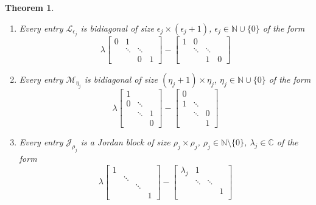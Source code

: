 \documentclass[]{book}
\providecommand{\tightlist}{%
  \setlength{\itemsep}{0pt}\setlength{\parskip}{0pt}}
\newtheorem{theorem}{Theorem}[chapter]
\theoremstyle{definition}
\theoremstyle{definition}
\theoremstyle{definition}
\theoremstyle{remark}
\begin{document}
\begin{theorem}
\begin{enumerate}
\def\labelenumi{\arabic{enumi}.}
\tightlist
\item
  Every entry \(\mathcal L_{\epsilon_j}\) is bidiagonal of size \(\epsilon_j\times (\epsilon_j +1)\), \(\epsilon_j \in \mathbb N \cup \{0\}\) of the form
  \begin{equation*}
  \lambda 
  \begin{bmatrix}
  0 & 1  \\
  & \ddots & \ddots \\
  && 0 & 1
  \end{bmatrix}
  -
  \begin{bmatrix}
  1 & 0  \\
  & \ddots & \ddots \\
  && 1 & 0
  \end{bmatrix}
  \end{equation*}
\item
  Every entry \(\mathcal M_{\eta_j}\) is bidiagonal of size \((\eta_j+1)\times \eta_j\), \(\eta_j \in \mathbb N \cup \{0\}\) of the form
  \begin{equation*}
  \lambda 
  \begin{bmatrix}
  1  \\
  0 & \ddots \\
  & \ddots & 1 \\
  && 0 
  \end{bmatrix}
  -
  \begin{bmatrix}
  0  \\
  1 & \ddots \\
  & \ddots & 0 \\
  && 1 
  \end{bmatrix}
  \end{equation*}
\item
  Every entry \(\mathcal J_{\rho_j}\) is a Jordan block of size \(\rho_j\times \rho_j\), \(\rho_j \in \mathbb N \setminus \{0\}\), \(\lambda_j \in \mathbb C\) of the form
  \begin{equation*}
  \lambda 
  \begin{bmatrix}
  1  \\
  & \ddots \\
  &&\ddots  \\
  &&& 1 
  \end{bmatrix}
  -
  \begin{bmatrix}
  \lambda_j & 1 \\
  & \ddots & \ddots \\
  &&& 1 \\

\end{bmatrix}
\end{equation*}
\end{enumerate}
\end{theorem}
\end{document}
